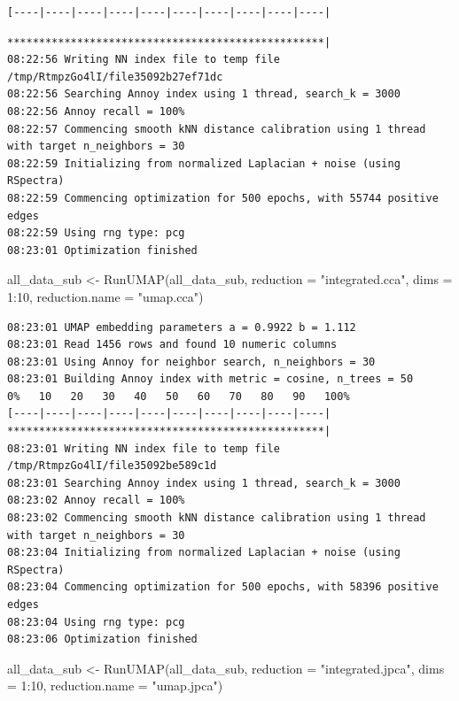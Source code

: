 \documentclass[
  letterpaper,
  DIV=11,
  numbers=noendperiod]{scrreprt}
\newenvironment{Shaded}{\begin{snugshade}}{\end{snugshade}}
\newcommand{\AttributeTok}[1]{\textcolor[rgb]{0.40,0.45,0.13}{#1}}
\newcommand{\DecValTok}[1]{\textcolor[rgb]{0.68,0.00,0.00}{#1}}
\newcommand{\FunctionTok}[1]{\textcolor[rgb]{0.28,0.35,0.67}{#1}}
\newcommand{\NormalTok}[1]{\textcolor[rgb]{0.00,0.23,0.31}{#1}}
\newcommand{\OtherTok}[1]{\textcolor[rgb]{0.00,0.23,0.31}{#1}}
\newcommand{\SpecialCharTok}[1]{\textcolor[rgb]{0.37,0.37,0.37}{#1}}
\newcommand{\StringTok}[1]{\textcolor[rgb]{0.13,0.47,0.30}{#1}}
\begin{document}
\begin{verbatim}
[----|----|----|----|----|----|----|----|----|----|
\end{verbatim}

\begin{verbatim}
**************************************************|
08:22:56 Writing NN index file to temp file /tmp/RtmpzGo4lI/file35092b27ef71dc
08:22:56 Searching Annoy index using 1 thread, search_k = 3000
08:22:56 Annoy recall = 100%
08:22:57 Commencing smooth kNN distance calibration using 1 thread with target n_neighbors = 30
08:22:59 Initializing from normalized Laplacian + noise (using RSpectra)
08:22:59 Commencing optimization for 500 epochs, with 55744 positive edges
08:22:59 Using rng type: pcg
08:23:01 Optimization finished
\end{verbatim}

\begin{Shaded}
\begin{Highlighting}[]
\NormalTok{all\_data\_sub }\OtherTok{\textless{}{-}} \FunctionTok{RunUMAP}\NormalTok{(all\_data\_sub, }\AttributeTok{reduction =} \StringTok{"integrated.cca"}\NormalTok{, }\AttributeTok{dims =} \DecValTok{1}\SpecialCharTok{:}\DecValTok{10}\NormalTok{, }\AttributeTok{reduction.name =} \StringTok{"umap.cca"}\NormalTok{)}
\end{Highlighting}
\end{Shaded}

\begin{verbatim}
08:23:01 UMAP embedding parameters a = 0.9922 b = 1.112
08:23:01 Read 1456 rows and found 10 numeric columns
08:23:01 Using Annoy for neighbor search, n_neighbors = 30
08:23:01 Building Annoy index with metric = cosine, n_trees = 50
0%   10   20   30   40   50   60   70   80   90   100%
[----|----|----|----|----|----|----|----|----|----|
**************************************************|
08:23:01 Writing NN index file to temp file /tmp/RtmpzGo4lI/file35092be589c1d
08:23:01 Searching Annoy index using 1 thread, search_k = 3000
08:23:02 Annoy recall = 100%
08:23:02 Commencing smooth kNN distance calibration using 1 thread with target n_neighbors = 30
08:23:04 Initializing from normalized Laplacian + noise (using RSpectra)
08:23:04 Commencing optimization for 500 epochs, with 58396 positive edges
08:23:04 Using rng type: pcg
08:23:06 Optimization finished
\end{verbatim}

\begin{Shaded}
\begin{Highlighting}[]
\NormalTok{all\_data\_sub }\OtherTok{\textless{}{-}} \FunctionTok{RunUMAP}\NormalTok{(all\_data\_sub, }\AttributeTok{reduction =} \StringTok{"integrated.jpca"}\NormalTok{, }\AttributeTok{dims =} \DecValTok{1}\SpecialCharTok{:}\DecValTok{10}\NormalTok{, }\AttributeTok{reduction.name =} \StringTok{"umap.jpca"}\NormalTok{)}
\end{Highlighting}
\end{Shaded}
\end{document}
